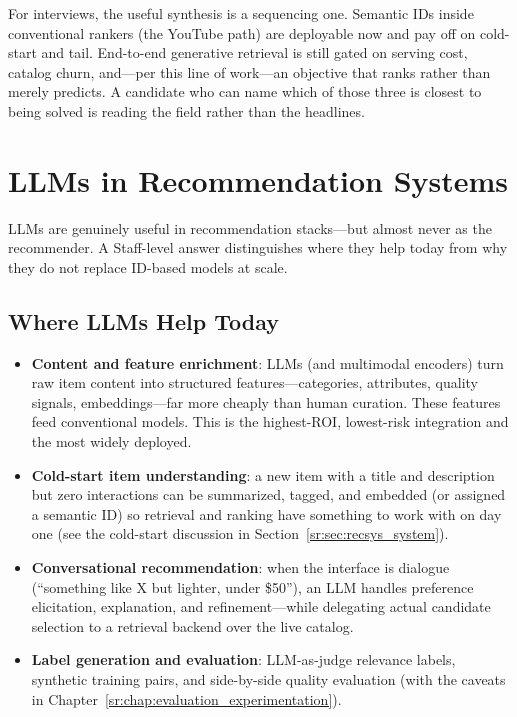 For interviews, the useful synthesis is a sequencing one. Semantic IDs inside conventional rankers (the YouTube path) are deployable now and pay off on cold-start and tail. End-to-end generative retrieval is still gated on serving cost, catalog churn, and---per this line of work---an objective that ranks rather than merely predicts. A candidate who can name which of those three is closest to being solved is reading the field rather than the headlines.

\section{LLMs in Recommendation Systems}
\label{sr:sec:llm_recsys}

LLMs are genuinely useful in recommendation stacks---but almost never as the recommender. A Staff-level answer distinguishes where they help today from why they do not replace ID-based models at scale.

\subsection{Where LLMs Help Today}

\begin{itemize}
    \item \textbf{Content and feature enrichment}: LLMs (and multimodal encoders) turn raw item content into structured features---categories, attributes, quality signals, embeddings---far more cheaply than human curation. These features feed conventional models. This is the highest-ROI, lowest-risk integration and the most widely deployed.
    \item \textbf{Cold-start item understanding}: a new item with a title and description but zero interactions can be summarized, tagged, and embedded (or assigned a semantic ID) so retrieval and ranking have something to work with on day one (see the cold-start discussion in Section~\ref{sr:sec:recsys_system}).
    \item \textbf{Conversational recommendation}: when the interface is dialogue (``something like X but lighter, under \$50''), an LLM handles preference elicitation, explanation, and refinement---while delegating actual candidate selection to a retrieval backend over the live catalog.
    \item \textbf{Label generation and evaluation}: LLM-as-judge relevance labels, synthetic training pairs, and side-by-side quality evaluation (with the caveats in Chapter~\ref{sr:chap:evaluation_experimentation}).
\end{itemize}

